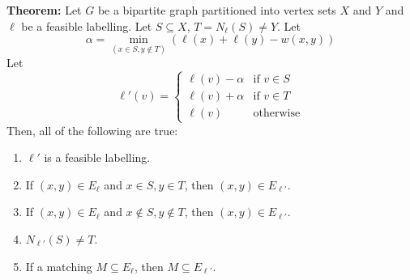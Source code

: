 \documentclass[12pt]{article}
\newcommand{\thm}{\noindent \textbf{Theorem: }}
\newcommand{\lskip}{\vspace{\baselineskip}}
\begin{document}
\thm Let $G$ be a bipartite graph partitioned into vertex sets $X$ and $Y$ and $\ell$ be a feasible labelling. Let $S \subseteq X$, $T = N_\ell(S) \neq Y$. Let \[ \alpha = \min_{(x \in S, y \notin T)} (\ell(x) + \ell(y) - w(x,y)) \]
Let
\[ \ell'(v) =
  \begin{cases}
    \ell(v) - \alpha & \text{if } v \in S \\
    \ell(v) + \alpha & \text{if } v \in T \\
    \ell(v) & \text{otherwise}
  \end{cases}
\]
Then, all of the following are true:
\begin{enumerate}
  \item $\ell'$ is a feasible labelling.
  \item If $(x,y) \in E_\ell$ and $x \in S, y \in T$, then $(x,y) \in E_{\ell'}$.
  \item If $(x,y) \in E_\ell$ and $x \notin S, y \notin T$, then $(x,y) \in E_{\ell'}$.
  \item $N_{\ell'}(S) \neq T$.
  \item If a matching $M \subseteq E_\ell$, then $M \subseteq E_{\ell'}$.
\end{enumerate}
\lskip
\end{document}
